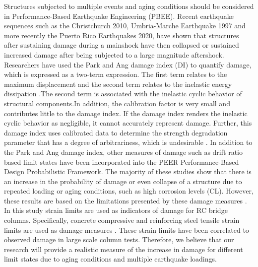 Structures subjected to multiple events and aging conditions should be considered in Performance-Based Earthquake Engineering (PBEE). Recent earthquake sequences such as the Christchurch 2010, Umbria-Marche Earthquake 1997 and more recently the Puerto Rico Earthquakes 2020, have shown that structures after sustaining damage during a mainshock have then collapsed or sustained increased damage after being subjected to a large magnitude aftershock\cite{Amato1998}\cite{Bradley}\cite{Miranda2020}. Researchers have used the Park and Ang damage index (DI) to quantify damage, which is expressed as a two-term expression. The first term relates to the maximum displacement and the second term relates to the inelastic energy dissipation \cite{Young-JiPark1985}.The second term is associated with the inelastic cyclic behavior of structural components.In addition, the calibration factor is very small and contributes little to the damage index. If the damage index renders the inelastic cyclic behavior as negligible, it cannot accurately represent damage. Further, this damage index uses calibrated data to determine the strength degradation parameter that has a degree of arbitrariness, which is undesirable \cite{Williams1995}. In addition to the Park and Ang damage index, other measures of damage such as drift ratio based limit states have been incorporated into the PEER Performance-Based Design Probabilistic Framework\cite{Padgett2007}\cite{Ghosh2015}\cite{Shekhar2018}. The majority of these studies show that there is an increase in the probability of damage or even collapse of a structure due to repeated loading or aging conditions, such as high corrosion levels (CL). However, these results are based on the limitations presented by these damage measures \cite{Shekhar2018}. In this study strain limits are used as indicators of damage for RC bridge columns. Specifically, concrete compressive and reinforcing steel tensile strain limits are used as damage measures \cite{Goodnight2016}. These strain limits have been correlated to observed damage in large scale column tests. Therefore, we believe that our research will provide a realistic measure of the increase in damage for different limit states due to aging conditions and multiple earthquake loadings. 

